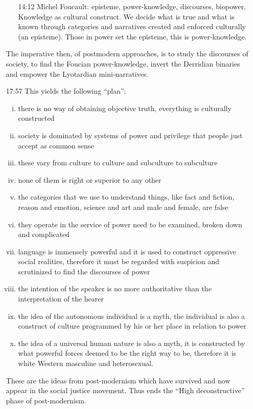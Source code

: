 \documentclass[10pt,titlepage]{book}
\begin{document}
\begin{itemize}
\begin{itemize}
   \item[14:12] Michel Foucault: episteme, power-knowledge, discourses, biopower.
     Knowledge as cultural construct.  We decide what is true and what is known through categories and narratives created and enforced culturally (an episteme).
     Those in power set the episteme, this is power-knowledge.
   \end{itemize}
   The imperative then, of postmodern approaches, is to study the discourses of society, to find the Foucian power-knowledge, invert the Derridian binaries and empower the Lyotardian mini-narratives.
   \item[17:57] This yields the following ``plan'':
     \begin{enumerate}[i)]
     \item there is no way of obtaining objective truth, everything is culturally constructed
     \item society is dominated by systems of power and privilege that people just accept as common sense
     \item these vary from culture to culture and subculture to subculture
     \item none of them is right or superior to any other
     \item the categories that we use to understand things, like fact and fiction, reason and emotion, science and art and male and female, are false
     \item they operate in the service of power need to be examined, broken down and complicated
     \item language is immensely powerful and it is used to construct oppressive social realities, therefore it must be regarded with suspicion and scrutinized to find the discourses of power
     \item the intention of the speaker is no more authoritative than the interpretation of the hearer
     \item the idea of the autonomous individual is a myth, the individual is also a construct of culture programmed by his or her place in relation to power
     \item the idea of a universal human nature is also a myth, it is constructed by what
powerful forces deemed to be the right way to be, therefore it is white Western masculine and heterosexual.
     \end{enumerate}
     These are the ideas from post-modernism which have survived and now appear in the social justice movement.
     Thus ends the ``High deconstructive'' phase of post-modernism.

\end{itemize}
\end{document}
